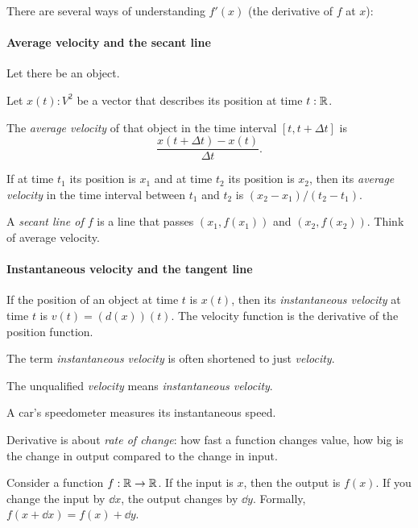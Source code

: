 There are several ways of understanding \(f'(x)\) (the derivative of \(f\) at \(x\)):

\paragraph{Average velocity and the secant line}

Let there be an object.

Let \(x(t) : V^2\) be a vector that describes its position at time \(t : \mathbb{R}\).

The \emph{average velocity} of that object in the time interval \([t,t+\Delta t]\) is
\[ \frac{x(t+\Delta t) - x(t)}{\Delta t}. \]

If at time \(t_1\) its position is \(x_1\)
and at time \(t_2\) its position is \(x_2\),
then its \emph{average velocity} in the time interval between \(t_1\) and \(t_2\)
is \((x_2 - x_1) / (t_2 - t_1)\).

A \emph{secant line of \(f\)} is a line that passes \((x_1,f(x_1))\) and \((x_2,f(x_2))\).
Think of average velocity.

\paragraph{Instantaneous velocity and the tangent line}

If the position of an object at time \(t\) is \(x(t)\),
then its \emph{instantaneous velocity} at time \(t\) is \(v(t) = (d(x))(t)\).
The velocity function is the derivative of the position function.

The term \emph{instantaneous velocity} is often shortened to just \emph{velocity}.

The unqualified \emph{velocity} means \emph{instantaneous velocity}.

A car's speedometer measures its instantaneous speed.

Derivative is about \emph{rate of change}:
how fast a function changes value,
how big is the change in output compared to the change in input.

Consider a function \(f : \mathbb{R} \to \mathbb{R}\).
If the input is \(x\), then the output is \(f(x)\).
If you change the input by \(\dd{x}\), the output changes by \(\dd{y}\).
Formally, \(f(x+\dd{x}) = f(x)+\dd{y}\).

